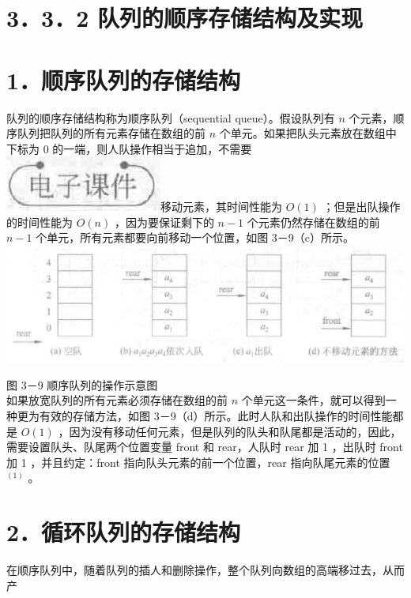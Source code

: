 \documentclass[10pt]{article}
\begin{document}
\section*{3．3．2 队列的顺序存储结构及实现}
\section*{1．顺序队列的存储结构}
队列的顺序存储结构称为顺序队列（sequential queue）。假设队列有 $n$ 个元素，顺序队列把队列的所有元素存储在数组的前 $n$ 个单元。如果把队头元素放在数组中下标为 0 的一端，则人队操作相当于追加，不需要\\
\includegraphics[max width=\textwidth]{2025_06_06_704745ea57b15b2333e5g-092}移动元素，其时间性能为 $O(1)$ ；但是出队操作的时间性能为 $O(n)$ ，因为要保证剩下的 $n-1$ 个元素仍然存储在数组的前 $n-1$ 个单元，所有元素都要向前移动一个位置，如图 3－9（c）所示。\\
\includegraphics[max width=\textwidth, center]{2025_06_06_704745ea57b15b2333e5g-092(1)}

图 3－9 顺序队列的操作示意图\\
如果放宽队列的所有元素必须存储在数组的前 $n$ 个单元这一条件，就可以得到一种更为有效的存储方法，如图 3－9（d）所示。此时人队和出队操作的时间性能都是 $O(1)$ ，因为没有移动任何元素，但是队列的队头和队尾都是活动的，因此，需要设置队头、队尾两个位置变量 front 和 rear，人队时 rear 加 1 ，出队时 front 加 1 ，并且约定：front 指向队头元素的前一个位置，rear 指向队尾元素的位置 ${ }^{(1)}$ 。

\section*{2．循环队列的存储结构}
在顺序队列中，随着队列的插人和删除操作，整个队列向数组的高端移过去，从而产
\end{document}
